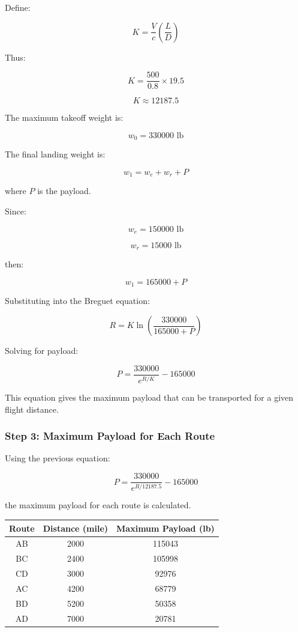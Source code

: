 \documentclass{KPS_assignment}
\begin{document}
Define:

\[
K=
\frac{V}{c}
\left(\frac{L}{D}\right)
\]

Thus:

\[
K=
\frac{500}{0.8}\times19.5
\]

\[
\boxed{
K\approx12187.5
}
\]

The maximum takeoff weight is:

\[
w_0=330000 \text{ lb}
\]

The final landing weight is:

\[
w_1=w_e+w_r+P
\]

where \(P\) is the payload.

Since:

\[
w_e=150000 \text{ lb}
\]

\[
w_r=15000 \text{ lb}
\]

then:

\[
w_1=165000+P
\]

Substituting into the Breguet equation:

\[
R=
K
\ln\left(
\frac{330000}{165000+P}
\right)
\]

Solving for payload:

\[
\boxed{
P=
\frac{330000}{e^{R/K}}
-165000
}
\]

This equation gives the maximum payload that can be transported for a given flight distance.


\subsubsection{Step 3: Maximum Payload for Each Route}

Using the previous equation:

\[
P=
\frac{330000}{e^{R/12187.5}}
-165000
\]

the maximum payload for each route is calculated.

\begin{center}
\begin{tabular}{|c|c|c|}
\hline
Route & Distance (mile) & Maximum Payload (lb) \\
\hline
AB & 2000 & 115043 \\
BC & 2400 & 105998 \\
CD & 3000 & 92976 \\
AC & 4200 & 68779 \\
BD & 5200 & 50358 \\
AD & 7000 & 20781 \\
\hline
\end{tabular}
\end{center}
\end{document}
